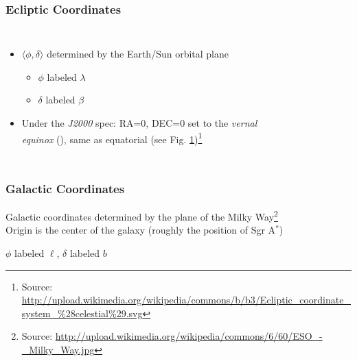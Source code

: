 \begin{frame}
\frametitle{Ecliptic Coordinates}
\begin{columns}[c]
\begin{itemize}
\item $\langle\phi,\delta\rangle$ determined by the Earth/Sun orbital plane
	\begin{itemize}
	\item $\phi$ labeled $\lambda$ 
	\item $\delta$ labeled $\beta$
	\end{itemize}
\item Under the \emph{J2000} spec: RA=0, DEC=0 set to the \emph{vernal equinox} (\Aries), same as equatorial (see Fig. \ref{ecliptic-figure})\footnote{Source: \url{http://upload.wikimedia.org/wikipedia/commons/b/b3/Ecliptic_coordinate_system_\%28celestial\%29.svg}}
\end{itemize}
\begin{figure}[h]
{\centering
{}
\label{ecliptic-figure}
}
\end{figure}
\end{columns}
\end{frame}
\begin{frame}
\frametitle{Galactic Coordinates}
Galactic coordinates determined by the plane of the Milky Way\footnote{Source: \url{http://upload.wikimedia.org/wikipedia/commons/6/60/ESO_-_Milky_Way.jpg}}\\
Origin is the center of the galaxy (roughly the position of Sgr A$^\ast$)
\begin{figure}[h]
{\centering
{}
}
\end{figure}
{\centering $\phi$ labeled $\ell$, $\delta$ labeled $b$}
\end{frame}
